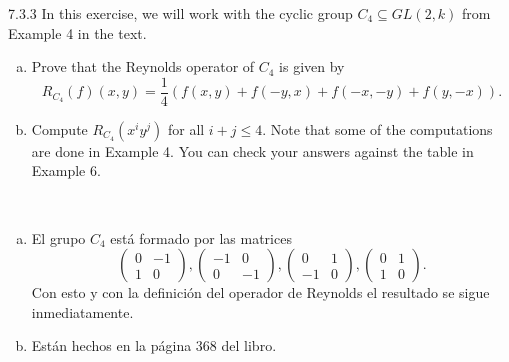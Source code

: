 \documentclass[twoside]{article}
\begin{document}
\begin{ejercicio}{7.3.3}
In this exercise, we will work with the cyclic group $C_4 ⊆ GL(2, k)$ from Example 4 in
the text.
\begin{enumerate}[a.]
\item Prove that the Reynolds operator of $C_4$ is given by
\[
R_{C_4} ( f )(x, y) =
\frac{1}{4}
( f (x, y) + f (−y, x) +f (−x,−y) + f (y,−x)).
\]
\item Compute $R_{C_4}(x^iy^j)$ for all $i + j ≤ 4$. Note that some of the computations are done in
Example 4. You can check your answers against the table in Example 6.
\end{enumerate}
\end{ejercicio}
\begin{solucion}\
\begin{enumerate}[a.]
\item El grupo $C_4$ está formado por las matrices
\[
\begin{pmatrix}
0 & -1\\
1 & 0
\end{pmatrix}, \begin{pmatrix}
-1 & 0\\
0 & -1
\end{pmatrix},\begin{pmatrix}
0 & 1\\
-1 & 0
\end{pmatrix}, \begin{pmatrix}
0 & 1\\
1 & 0
\end{pmatrix}.
\]
Con esto y con la definición del operador de Reynolds el resultado se sigue inmediatamente.
\item Están hechos en la página 368 del libro.
\end{enumerate}

\end{solucion}
\end{document}
